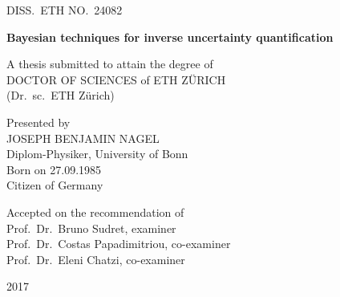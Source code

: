 \begin{titlepage}

\begin{center}

\thispagestyle{allempty}

{\large DISS.\ ETH NO.\ 24082 \par}

\vfill

\begin{Huge}
\textbf{Bayesian techniques for inverse uncertainty quantification} \par
\end{Huge}


\vfill

\begin{large}
A thesis submitted to attain the degree of \\[1ex]
DOCTOR OF SCIENCES of ETH ZÜRICH \\[1ex]
(Dr.\ sc.\ ETH Zürich) \par
\end{large}

\vfill

\begin{large}
Presented by \\[1ex]
JOSEPH BENJAMIN NAGEL \\[1ex]
Diplom-Physiker, University of Bonn \\[1ex]
Born on 27.09.1985 \\[1ex]
Citizen of Germany \par
\end{large}

\vfill

\begin{large}
Accepted on the recommendation of \\[1ex]
Prof.\ Dr.\ Bruno Sudret, examiner \\[1ex]
Prof.\ Dr.\ Costas Papadimitriou, co-examiner \\[1ex]
Prof.\ Dr.\ Eleni Chatzi, co-examiner \par
\end{large}

\vfill

{\large 2017 \par}

\end{center}

\end{titlepage}